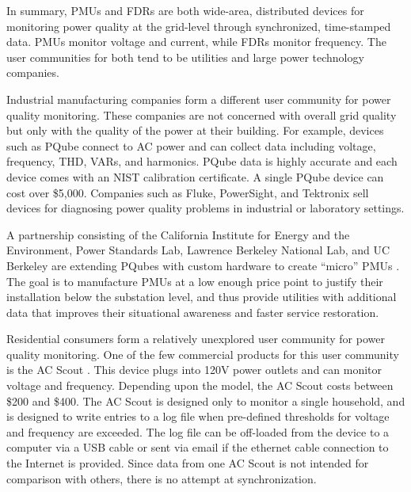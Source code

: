 In summary, PMUs and FDRs are both wide-area, distributed devices for monitoring power quality at the grid-level through synchronized, time-stamped data. PMUs monitor voltage and current, while FDRs monitor frequency.  The user communities for both tend to be utilities and large power technology companies. 

Industrial manufacturing companies form a different user community for power quality monitoring. These companies are not concerned with overall grid quality but only with the quality of the power at their building.  For example, devices such as PQube \cite{pqube} connect to AC power and can collect data including voltage, frequency, THD, VARs, and harmonics. PQube data is highly accurate and each device comes with an NIST calibration certificate. A single PQube device can cost over \$5,000.   Companies such as Fluke, PowerSight, and Tektronix sell devices for diagnosing power quality problems in industrial or laboratory settings. 

A partnership consisting of the California Institute for Energy and the Environment, Power Standards Lab, Lawrence Berkeley National Lab, and UC Berkeley are extending PQubes with custom hardware to create ``micro'' PMUs \cite{Meier2013,Meier2014}.  The goal is to manufacture PMUs at a low enough price point to justify their installation below the substation level, and thus provide utilities with additional data that improves their situational awareness and faster service restoration.  

Residential consumers form a relatively unexplored user community for power quality monitoring.   One of the few commercial products for this user community is the AC Scout \cite{acscout}.  This device plugs into 120V power outlets and can monitor voltage and frequency.  Depending upon the model, the AC Scout costs between \$200 and \$400. The AC Scout is designed only to monitor a single household, and is designed to write entries to a log file when pre-defined thresholds for voltage and frequency are exceeded. The log file can be off-loaded from the device to a computer via a USB cable or sent via email if the ethernet cable connection to the Internet is provided. Since data from one AC Scout is not intended for comparison with others, there is no attempt at synchronization.

